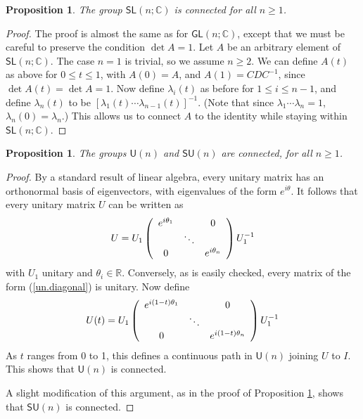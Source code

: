 \documentclass[12pt]{amsbook}
\theoremstyle{plain}
\newtheorem{proposition}[theorem]{Proposition}
\numberwithin{equation}{chapter}
\numberwithin{theorem}{chapter}
\begin{document}
\begin{proposition}
\label{slnc.connect}The group $\mathsf{SL}\left(  n;\mathbb{C}\right)  $ is
connected for all $n\geq1$.
\end{proposition}

\begin{proof}
The proof is almost the same as for $\mathsf{GL}(n;\mathbb{C})$, except that
we must be careful to preserve the condition $\det A=1$. Let $A$ be an
arbitrary element of $\mathsf{SL}\left(  n;\mathbb{C}\right)  $. The case
$n=1$ is trivial, so we assume $n\geq2$. We can define $A(t)$ as above for
$0\leq t\leq1$, with $A(0)=A$, and $A(1)=CDC^{-1}$, since $\det A(t)=\det
A=1$. Now define $\lambda_{i}(t)$ as before for $1\leq i\leq n-1$, and define
$\lambda_{n}(t)$ to be $\left[  \lambda_{1}(t)\cdots\lambda_{n-1}(t)\right]
^{-1}$. (Note that since $\lambda_{1}\cdots\lambda_{n}=1$, $\lambda
_{n}(0)=\lambda_{n}$.) This allows us to connect $A$ to the identity while
staying within $\mathsf{SL}\left(  n;\mathbb{C}\right)  $.
\end{proof}

\begin{proposition}
The groups $\mathsf{U}(n)$ and $\mathsf{SU}(n)$ are connected, for all
$n\geq1$.
\end{proposition}

\begin{proof}
By a standard result of linear algebra, every unitary matrix has an
orthonormal basis of eigenvectors, with eigenvalues of the form $e^{i\theta}$.
It follows that every unitary matrix $U$ can be written as
\begin{equation}
U=U_{1}\left(
\begin{array}
[c]{ccc}%
e^{i\theta_{1}} &  & 0\\
& \ddots & \\
0 &  & e^{i\theta_{n}}%
\end{array}
\right)  U_{1}^{-1}\label{un.diagonal}%
\end{equation}
with $U_{1}$ unitary and $\theta_{i}\in\mathbb{R}$. Conversely, as is easily
checked, every matrix of the form (\ref{un.diagonal}) is unitary. Now define
\[
U(t)=U_{1}\left(
\begin{array}
[c]{ccc}%
e^{i(1-t)\theta_{1}} &  & 0\\
& \ddots & \\
0 &  & e^{i(1-t)\theta_{n}}%
\end{array}
\right)  U_{1}^{-1}%
\]
As $t$ ranges from 0 to 1, this defines a continuous path in $\mathsf{U}(n)$
joining $U$ to $I$. This shows that $\mathsf{U}(n)$ is connected.

A slight modification of this argument, as in the proof of Proposition
\ref{slnc.connect}, shows that $\mathsf{SU}(n)$ is connected.
\end{proof}
\end{document}
